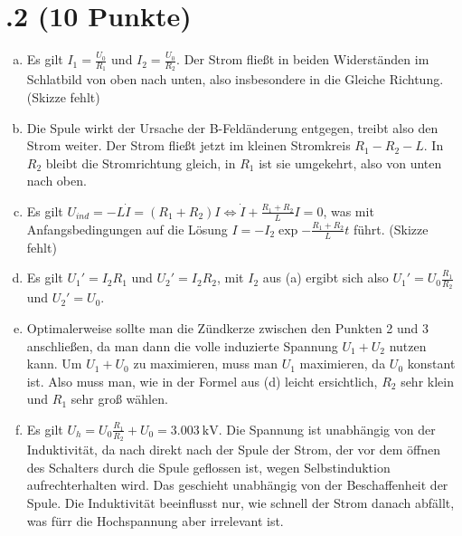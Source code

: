 \section*{\nr.2 \tittwo (10 Punkte)}
\begin{enumerate}[(a)]
\item Es gilt $I_1 = \frac{U_0}{R_1}$ und $I_2 = \frac{U_0}{R_2}$. Der Strom fließt in beiden Widerständen im Schlatbild von oben nach unten, also insbesondere in die Gleiche Richtung.
(Skizze fehlt)
\item Die Spule wirkt der Ursache der B-Feldänderung entgegen, treibt also den Strom weiter. Der Strom fließt jetzt im kleinen Stromkreis $R_1 - R_2 - L$. In $R_2$ bleibt die Stromrichtung gleich, in $R_1$ ist sie umgekehrt, also von unten nach oben.
\item  Es gilt $U_{ind} = -L\dot{I} = (R_1 + R_2)I \Leftrightarrow \dot{I} + \frac{R_1 + R_2}{L}I = 0$, was mit Anfangsbedingungen auf die Lösung $I = -I_2 \exp{-\frac{R_1 + R_2}{L}t}$ führt. (Skizze fehlt)
\item Es gilt $U_1' = I_2 R_1$ und $U_2' = I_2 R_2$, mit $I_2$ aus (a) ergibt sich also $U_1' = U_0\frac{R_1}{R_2}$ und $U_2' = U_0$.
\item Optimalerweise sollte man die Zündkerze zwischen den Punkten 2 und 3 anschließen, da man dann die volle induzierte Spannung $U_1 + U_2$ nutzen kann. Um $U_1 + U_0$ zu maximieren, muss man $U_1$ maximieren, da $U_0$ konstant ist. Also muss man, wie in der Formel aus (d) leicht ersichtlich, $R_2$ sehr klein und $R_1$ sehr groß wählen.
\item Es gilt $U_h = U_0\frac{R_1}{R_2} + U_0 = \SI{3.003}{\kilo \volt}$. Die Spannung ist unabhängig von der Induktivität, da nach direkt nach der Spule der Strom, der vor dem öffnen des Schalters durch die Spule geflossen ist, wegen Selbstinduktion aufrechterhalten wird. Das geschieht unabhängig von der Beschaffenheit der Spule. Die Induktivität beeinflusst nur, wie schnell der Strom danach abfällt, was fürr die Hochspannung aber irrelevant ist.
\end{enumerate}
